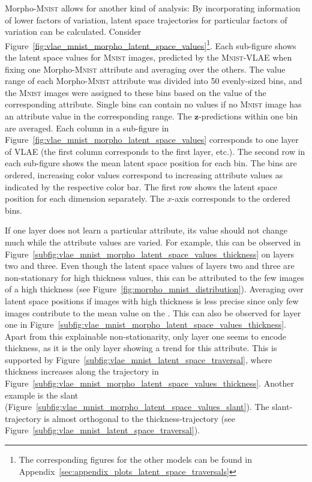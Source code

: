 Morpho-\textsc{Mnist} allows for another kind of analysis:
By incorporating information of lower factors of variation, latent space trajectories for particular factors of variation can be calculated.
Consider Figure~\ref{fig:vlae_mnist_morpho_latent_space_values}\footnote{The corresponding figures for the other models can be found in Appendix~\ref{sec:appendix_plots_latent_space_traversals}}.
Each sub-figure shows the latent space values for \textsc{Mnist} images, predicted by the \textsc{Mnist}-\ac{VLAE} when fixing one Morpho-\textsc{Mnist} attribute and averaging over the others.
The value range of each Morpho-\textsc{Mnist} attribute was divided into 50 evenly-sized bins, and the \textsc{Mnist} images were assigned to these bins based on the value of the corresponding attribute.
Single bins can contain no values if no \textsc{Mnist} image has an attribute value in the corresponding range.
The $\bm{z}$-predictions within one bin are averaged.
Each column in a sub-figure in Figure~\ref{fig:vlae_mnist_morpho_latent_space_values} corresponds to one layer of \ac{VLAE} (the first column corresponds to the first layer, etc.).
The second row in each sub-figure shows the mean latent space position for each bin.
The bins are ordered, increasing color values correspond to increasing attribute values as indicated by the respective color bar.
The first row shows the latent space position for each dimension separately.
The $x$-axis corresponds to the ordered bins.

If one layer does not learn a particular attribute, its value should not change much while the attribute values are varied.
For example, this can be observed in Figure~\ref{subfig:vlae_mnist_morpho_latent_space_values_thickness} on layers two and three.
Even though the latent space values of layers two and three are non-stationary for high thickness values, this can be attributed to the few images of a high thickness (see Figure~\ref{fig:morpho_mnist_distribution}).
Averaging over latent space positions if images with high thickness is less precise since only few images contribute to the mean value on the .
This can also be observed for layer one in Figure~\ref{subfig:vlae_mnist_morpho_latent_space_values_thickness}.
Apart from this explainable non-stationarity, only layer one seems to encode thickness, as it is the only layer showing a trend for this attribute.
This is supported by Figure~\ref{subfig:vlae_mnist_latent_space_traversal}, where thickness increases along the trajectory in Figure~\ref{subfig:vlae_mnist_morpho_latent_space_values_thickness}.
Another example is the slant (Figure~\ref{subfig:vlae_mnist_morpho_latent_space_values_slant}).
The slant-trajectory is almost orthogonal to the thickness-trajectory (see Figure~\ref{subfig:vlae_mnist_latent_space_traversal}).

